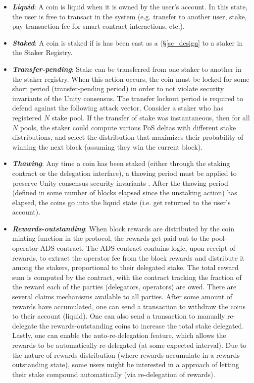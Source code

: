 \begin{itemize}
    \item \textbf{\textit{Liquid}}: A coin is liquid when it is owned by the user's account. In this state, the user is free to transact in the system (e.g. transfer to another user, stake, pay transaction fee for smart contract interactions, etc.).
    \item \textbf{\textit{Staked}}: A coin is staked if is has been cast as a  (\S\ref{sc_design} to a staker in the Staker Registry. 
    \item \textbf{\textit{Transfer-pending}}: Stake can be transferred from one staker to another in the staker registry. When this action occurs, the coin must be locked for some short period (transfer-pending period) in order to not violate security invariants of the Unity consensus. The transfer lockout period is required to defend against the following attack vector. Consider a staker who has registered $N$ stake pool. If the transfer of stake was instantaneous, then for all $N$ pools, the staker could compute various PoS  deltas with different stake distributions, and select the distribution that maximizes their probability of winning the next block (assuming they win the current block).  
    \item \textbf{\textit{Thawing}}: Any time a coin has been staked (either through the staking contract or the delegation interface), a thawing period must be applied to preserve Unity consensus security invariants \cite{WZS19}. After the thawing period (defined in some number of blocks elapsed since the unstaking action) has elapsed, the coins go into the liquid state (i.e. get returned to the user's account). 
    \item \textbf{\textit{Rewards-outstanding}}: When block rewards are distributed by the coin minting function in the protocol, the rewards get paid out to the pool-operator ADS contract. The ADS contract contains logic, upon receipt of rewards, to extract the operator fee from the block rewards and distribute it among the stakers, proportional to their delegated stake. The total reward sum is computed by the contract, with the contract tracking the fraction of the reward each of the parties (delegators, operators) are owed. There are several claims mechanisms available to all parties. After some amount of rewards have accumulated, one can send a transaction to withdraw the coins to their account (liquid). One can also send a transaction to manually re-delegate the rewards-outstanding coins to increase the total stake delegated. Lastly, one can enable the auto-re-delegation feature, which allows the rewards to be automatically re-delegated (at some expected interval). Due to the nature of rewards distribution (where rewards accumulate in a rewards outstanding state), some users might be interested in a  approach of letting their stake compound automatically (via re-delegation of rewards).
\end{itemize}

